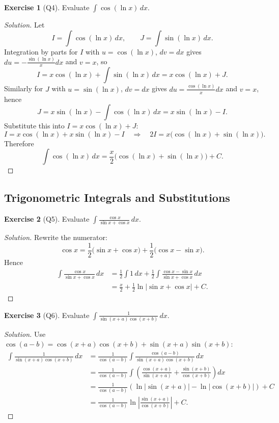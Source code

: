 \documentclass[11pt]{article}
\theoremstyle{definition}
\newtheorem{exercise}{Exercise}[section]
\newenvironment{solution}{\begin{proof}[Solution]}{\end{proof}}
\begin{document}
\begin{exercise}[Q4]
Evaluate $\displaystyle \int \cos(\ln x)\,dx$.
\end{exercise}

\begin{solution}
Let
\[
I=\int \cos(\ln x)\,dx,\qquad J=\int \sin(\ln x)\,dx.
\]
Integration by parts for $I$ with $u=\cos(\ln x)$, $dv=dx$ gives $du=-\frac{\sin(\ln x)}{x}dx$ and $v=x$, so
\[
I=x\cos(\ln x)+\int \sin(\ln x)\,dx=x\cos(\ln x)+J.
\]
Similarly for $J$ with $u=\sin(\ln x)$, $dv=dx$ gives $du=\frac{\cos(\ln x)}{x}dx$ and $v=x$, hence
\[
J=x\sin(\ln x)-\int \cos(\ln x)\,dx=x\sin(\ln x)-I.
\]
Substitute this into $I=x\cos(\ln x)+J$:
\[
I=x\cos(\ln x)+x\sin(\ln x)-I
\quad\Rightarrow\quad
2I=x\bigl(\cos(\ln x)+\sin(\ln x)\bigr).
\]
Therefore
\[
\int \cos(\ln x)\,dx=\frac{x}{2}\bigl(\cos(\ln x)+\sin(\ln x)\bigr)+C.
\]
\end{solution}

\subsection{Trigonometric Integrals and Substitutions}

\begin{exercise}[Q5]
Evaluate $\displaystyle \int \frac{\cos x}{\sin x+\cos x}\,dx$.
\end{exercise}

\begin{solution}
Rewrite the numerator:
\[
\cos x=\frac{1}{2}\bigl(\sin x+\cos x\bigr)+\frac{1}{2}\bigl(\cos x-\sin x\bigr).
\]
Hence
\begin{align*}
\int \frac{\cos x}{\sin x+\cos x}\,dx
&=\frac{1}{2}\int 1\,dx+\frac{1}{2}\int \frac{\cos x-\sin x}{\sin x+\cos x}\,dx \\
&=\frac{x}{2}+\frac{1}{2}\ln|\sin x+\cos x|+C.
\end{align*}
\end{solution}

\begin{exercise}[Q6]
Evaluate $\displaystyle \int \frac{1}{\sin(x+a)\cos(x+b)}\,dx$.
\end{exercise}

\begin{solution}
Use $\cos(a-b)=\cos(x+a)\cos(x+b)+\sin(x+a)\sin(x+b)$:
\begin{align*}
\int \frac{1}{\sin(x+a)\cos(x+b)}\,dx
&=\frac{1}{\cos(a-b)}\int \frac{\cos(a-b)}{\sin(x+a)\cos(x+b)}\,dx \\
&=\frac{1}{\cos(a-b)}\int\left(\frac{\cos(x+a)}{\sin(x+a)}+\frac{\sin(x+b)}{\cos(x+b)}\right)dx \\
&=\frac{1}{\cos(a-b)}\left(\ln|\sin(x+a)|-\ln|\cos(x+b)|\right)+C \\
&=\frac{1}{\cos(a-b)}\ln\left|\frac{\sin(x+a)}{\cos(x+b)}\right|+C.
\end{align*}
\end{solution}
\end{document}
